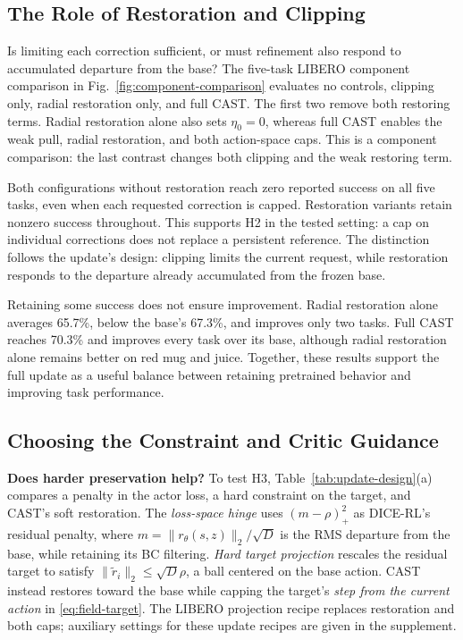 


\subsection{The Role of Restoration and Clipping}
\label{sec:exp-controls}


Is limiting each correction sufficient, or must refinement also respond
to accumulated departure from the base? The five-task LIBERO component
comparison in Fig.~\ref{fig:component-comparison} evaluates no controls,
clipping only, radial restoration only, and full CAST. The first two
remove both restoring terms. Radial restoration alone also sets
$\eta_0=0$, whereas full CAST enables the weak pull, radial restoration,
and both action-space caps. This is a component comparison: the last
contrast changes both clipping and the weak restoring term.

Both configurations without restoration reach zero reported success on
all five tasks, even when each requested correction is capped.
Restoration variants retain nonzero success throughout. This supports H2
in the tested setting: a cap on individual corrections does not replace
a persistent reference. The distinction follows the update's design:
clipping limits the current request, while restoration responds to the
departure already accumulated from the frozen base.

Retaining some success does not ensure improvement. Radial restoration
alone averages 65.7\%, below the base's 67.3\%, and improves only two
tasks. Full CAST reaches 70.3\% and improves every task over its base,
although radial restoration alone remains better on red mug and juice.
Together, these results support the full update as a useful balance
between retaining pretrained behavior and improving task performance.

\subsection{Choosing the Constraint and Critic Guidance}
\label{sec:exp-design}


\textbf{Does harder preservation help?}
To test H3, Table~\ref{tab:update-design}(a) compares a penalty in the
actor loss, a hard constraint on the target, and CAST's soft restoration.
The \emph{loss-space hinge} uses $(m-\rho)_+^2$ as DICE-RL's residual
penalty, where $m=\|r_\theta(s,z)\|_2/\sqrt{D}$ is the RMS departure
from the base, while retaining its BC filtering. \emph{Hard target
projection} rescales the residual target to satisfy
$\|\tilde r_i\|_2\leq\sqrt{D}\rho$, a ball centered on the base action.
CAST instead restores toward the base while capping the target's
\emph{step from the current action} in \eqref{eq:field-target}.
The LIBERO projection recipe replaces restoration and both caps;
auxiliary settings for these update recipes are given in the supplement.

